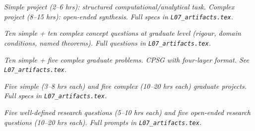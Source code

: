 \begin{tcolorbox}[ugprobbox, title={SPJU + CPJU · L07 · Tiers 2–3}]
\textit{Simple project (2–6 hrs): structured computational/analytical task.
Complex project (8–15 hrs): open-ended synthesis.
Full specs in \texttt{L07_artifacts.tex}.}
\end{tcolorbox}

\begin{tcolorbox}[gradconceptbox, title={SCQG + CCQG · L07 · Tiers 4–5}]
\textit{Ten simple + ten complex concept questions at graduate level (rigour, domain
conditions, named theorems). Full questions in \texttt{L07_artifacts.tex}.}
\end{tcolorbox}

\begin{tcolorbox}[gradprobbox, title={SPSG + CPSG · L07 · Tiers 4–5}]
\textit{Ten simple + five complex graduate problems.
CPSG with four-layer format. See \texttt{L07_artifacts.tex}.}
\end{tcolorbox}

\begin{tcolorbox}[gradprobbox, title={SPJG (×5) + CPJG (×5) · L07 · Tiers 4–5}]
\textit{Five simple (3–8 hrs each) and five complex (10–20 hrs each) graduate projects.
Full specs in \texttt{L07_artifacts.tex}.}
\end{tcolorbox}

\begin{tcolorbox}[researchbox, title={WRQ (×5) + ORQ (×5) · L07 · Tiers 4–5}]
\textit{Five well-defined research questions (5–10 hrs each) and five open-ended
research questions (10–20 hrs each). Full prompts in \texttt{L07_artifacts.tex}.}
\end{tcolorbox}
